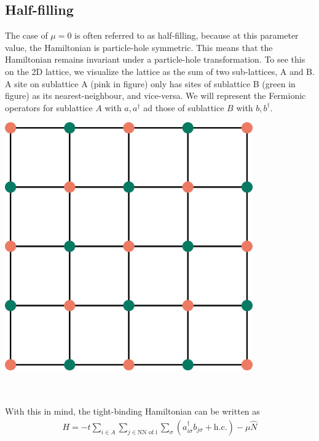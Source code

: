 \documentclass[12pt]{article}
\numberwithin{equation}{section}
\begin{document}
\newpage
\subsection*{Half-filling}
\begin{minipage}{0.5\textwidth}
	The case of \(\mu=0\) is often referred to as half-filling, because at this parameter value, the Hamiltonian is particle-hole symmetric. This means that the Hamiltonian remains invariant under a particle-hole transformation. To see this on the 2D lattice, we visualize the lattice as the sum of two sub-lattices, A and B. A site on sublattice A (pink in figure) only has sites of sublattice B (green in figure) as its nearest-neighbour, and vice-versa. We will represent the Fermionic operators for sublattice \(A\) with \(a,a^\dagger\) ad those of sublattice \(B\) with \(b, b^\dagger\).
\end{minipage}
\hspace*{\fill}
\begin{minipage}{0.4\textwidth}
	\centering
	\includegraphics[width=0.8\textwidth]{./sublattice.png}
\end{minipage}
\\\\
With this in mind, the tight-binding Hamiltonian can be written as
\begin{equation}\begin{aligned}
	H = -t\sum_{i \in A}\sum_{j \in \text{NN of i}} \sum_\sigma\left(a^\dagger_{i \sigma}b_{j\sigma} + \text{h.c.}\right) - \mu \hat N
\end{aligned}\end{equation}
\end{document}
